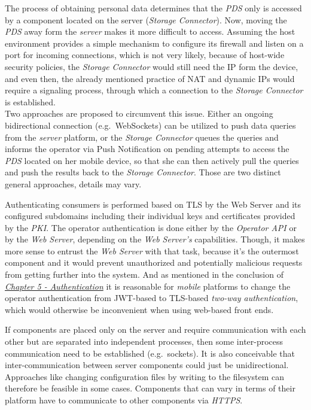 \documentclass[12pt,english,a4paper,titlepage,cleardoublepage=empty,dottedtoc]{report}
\begin{document}
The process of obtaining personal data determines that the \emph{PDS}
only is accessed by a component located on the server (\emph{Storage
Connector}). Now, moving the \emph{PDS} away form the \emph{server}
makes it more difficult to access. Assuming the host environment
provides a simple mechanism to configure its firewall and listen on a
port for incoming connections, which is not very likely, because of
host-wide security policies, the \emph{Storage Connector} would still
need the IP form the device, and even then, the already mentioned
practice of NAT and dynamic IPs would require a signaling process,
through which a connection to the \emph{Storage Connector} is
established.\\
Two approaches are proposed to circumvent this issue. Either an ongoing
bidirectional connection (e.g.~WebSockets) can be utilized to push data
queries from the \emph{server} platform, or the \emph{Storage Connector}
queues the queries and informs the operator via Push Notification on
pending attempts to access the \emph{PDS} located on her mobile device,
so that she can then actively pull the queries and push the results back
to the \emph{Storage Connector}. Those are two distinct general
approaches, details may vary.

Authenticating consumers is performed based on TLS by the Web Server and
its configured subdomains including their individual keys and
certificates provided by the \emph{PKI}. The operator authentication is
done either by the \emph{Operator API} or by the \emph{Web Server},
depending on the \emph{Web Server's} capabilities. Though, it makes more
sense to entrust the \emph{Web Server} with that task, because it's the
outermost component and it would prevent unauthorized and potentially
malicious requests from getting further into the system. And as
mentioned in the conclusion of
\emph{\protect\hyperlink{authentication}{Chapter 5 - Authentication}} it
is reasonable for \emph{mobile} platforms to change the operator
authentication from JWT-based to TLS-based \emph{two-way
authentication}, which would otherwise be inconvenient when using
web-based front ends.

If components are placed only on the server and require communication
with each other but are separated into independent processes, then some
inter-process communication need to be established (e.g.~sockets). It is
also conceivable that inter-communication between server components
could just be unidirectional. Approaches like changing configuration
files by writing to the filesystem can therefore be feasible in some
cases. Components that can vary in terms of their platform have to
communicate to other components via \emph{HTTPS}.
\end{document}
